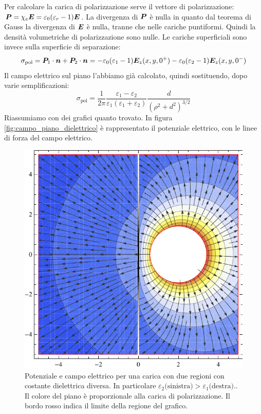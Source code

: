 \begin{Es}
  Per calcolare la carica di polarizzazione serve il vettore di polarizzazione: $\boldsymbol{P} = \chi_e\boldsymbol{E}=\varepsilon_0(\varepsilon_r-1)\boldsymbol{E}$. La divergenza di $\boldsymbol{P}$ è nulla in quanto dal teorema di Gauss la divergenza di $\boldsymbol{E}$ è nulla, tranne che nelle cariche puntiformi. Quindi la densità volumetriche di polarizzazione sono nulle. Le cariche superficiali sono invece sulla superficie di separazione:
  \[
    \sigma_\text{pol} = \boldsymbol{P}_1\cdot\boldsymbol{n}+\boldsymbol{P}_2\cdot\boldsymbol{n} = -\varepsilon_0(\varepsilon_1-1)\boldsymbol{E}_z(x,y,0^+)-\varepsilon_0(\varepsilon_2-1)\boldsymbol{E}_z(x,y,0^-)
  \]
  Il campo elettrico sul piano l'abbiamo già calcolato, quindi sostituendo, dopo varie semplificazioni:
  \[
    \sigma_\text{pol} = \frac{1}{2\pi}\frac{\varepsilon_1-\varepsilon_2}{\varepsilon_1(\varepsilon_1+\varepsilon_2)}\frac{d}{(\rho^2+d^2)^{3/2}}
  \]
  Riassumiamo con dei grafici quanto trovato. In figura \ref{fig:campo_piano_dielettrico} è rappresentato il potenziale elettrico, con le linee di forza del campo elettrico.
  \begin{figure}[htbp]
    \centering
    \includegraphics{immagini/fisica2/campo_due_dielettrici1}
    \caption{Potenziale e campo elettrico per una carica con due regioni con costante dielettrica diversa. In particolare $\varepsilon_2 \text{(sinistra)}>\varepsilon_1\text{(destra).}$. Il colore del piano è proporzionale alla carica di polarizzazione. Il bordo rosso indica il limite della regione del grafico.}

\end{figure}
\end{Es}
